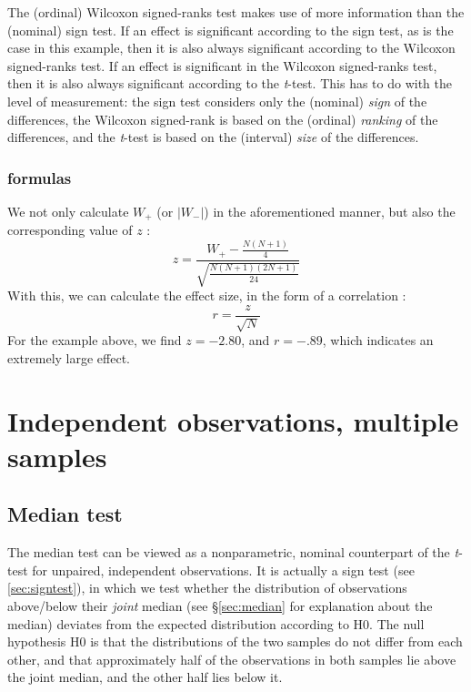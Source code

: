 \documentclass[
]{book}
\begin{document}
The (ordinal) Wilcoxon signed-ranks test makes use of more information
than the (nominal) sign test. If an effect is significant according to the sign
test, as is the case in this example, then it is also always significant
according to the Wilcoxon signed-ranks test. If an effect is significant
in the Wilcoxon signed-ranks test, then it is also always significant according
to the \emph{t}-test. This has to do with the level of measurement: the sign test
considers only the (nominal) \emph{sign} of the differences, the
Wilcoxon signed-rank is based on the (ordinal) \emph{ranking} of the
differences, and the \emph{t}-test is based on the (interval) \emph{size} of the
differences.

\subsubsection{formulas}\label{formulas-7}

We not only calculate \(W_+\) (or \(|W_-|\)) in the aforementioned manner, but also
the corresponding value of \(z\) \citep{Ferg89}:
\begin{equation}
  \label{eq:Wilcoxon-signedrank-z}
  z = \frac{ W_+ - \frac{N(N+1)}{4} } { \sqrt{ \frac{N(N+1)(2N+1)}{24} } }
\end{equation}
With this, we can calculate the effect size, in the form of
a correlation \citep[ Eq.2.18]{Rose91}:
\begin{equation}
  \label{eq:es-z2r}
    r = \frac {z} {\sqrt{N}}
\end{equation}
For the example above, we find
\(z=-2.80\), and \(r=-.89\), which indicates an extremely large effect.

\section{Independent observations, multiple samples}\label{independent-observations-multiple-samples}

\subsection{Median test}\label{median-test}

The median test can be viewed as a nonparametric, nominal
counterpart
of the \emph{t}-test for unpaired, independent observations. It is actually
a sign test (see \ref{sec:signtest}), in which we test whether the
distribution of observations above/below their \emph{joint} median
(see §\ref{sec:median} for explanation about the median) deviates from
the expected distribution according to H0.
The null hypothesis H0 is that the distributions of the two samples
do not differ from each other, and that approximately half of the observations
in both samples lie above the joint median, and the other half lies below
it.
\end{document}
